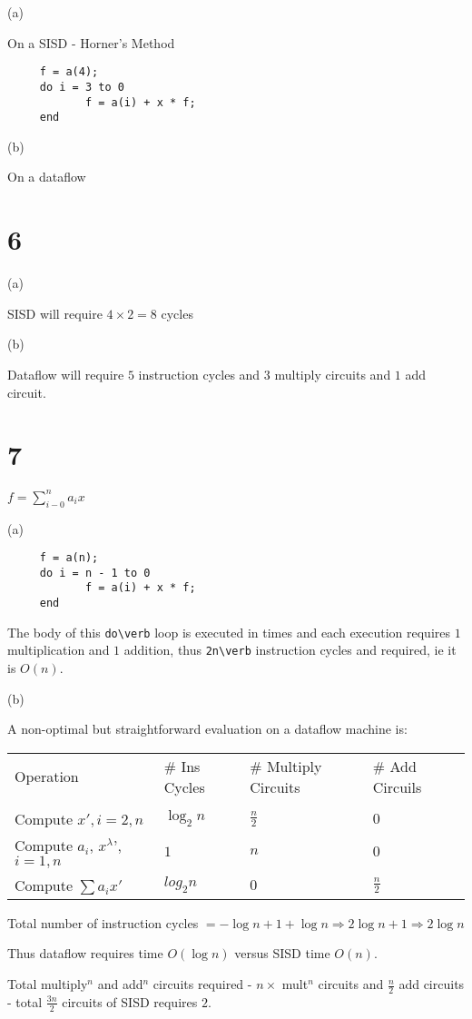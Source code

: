\documentclass[a4paper,12pt]{article}
\begin{document}
(a)

On a SISD - Horner's Method

\begin{verbatim}
     f = a(4);
     do i = 3 to 0
            f = a(i) + x * f;
     end
\end{verbatim}

(b)

On a dataflow

\begin{table}[hbtp]


\end{table}

\section*{6}

(a)

SISD will require $4 \times 2 = 8$ cycles

(b)

Dataflow will require $5$ instruction cycles and $3$ multiply circuits
and $1$ add circuit.

\section*{7}

$f = \sum^{n}_{i - 0} a_{i} x$

(a)

\begin{verbatim}
     f = a(n);
     do i = n - 1 to 0
            f = a(i) + x * f;
     end
\end{verbatim}

The body of this \verb!do\verb! loop is executed in times and each
execution requires $1$ multiplication and $1$ addition, thus
\verb!2n\verb! instruction cycles and required, ie it is $O(n)$.

(b)

A non-optimal but straightforward evaluation on a dataflow machine is:

\begin{tabular}{llll}
Operation					&	\# Ins Cycles	&	\# Multiply Circuits	&	\# Add Circuils	\\
								&						&								&							\\
Compute $x', i = 2, n$	&	$\log_{2}{n}$	&	$\frac{n}{2}$			&	$0$					\\
Compute $a_{i}$, $x^{\lambda}$', $i = 1, n$	&	$1$	&	$n$		&	$0$					\\
Compute $\sum a_{i} x'$	&	$log_{2}{n}$	&	$0$						&	$\frac{n}{2}$		\\
\end{tabular}

Total number of instruction cycles $= -\log{n} + 1 + \log{n} \Rightarrow
2 \log{n} + 1 \Rightarrow 2 \log{n}$

Thus dataflow requires time $O\left( \log{n} \right)$ versus SISD time
$O(n)$.

Total multiply$^{n}$ and add$^{n}$ circuits required - $n \times$
mult$^{n}$ circuits and $\frac{n}{2}$ add circuits - total
$\frac{3n}{2}$ circuits of SISD requires $2$.
\end{document}
